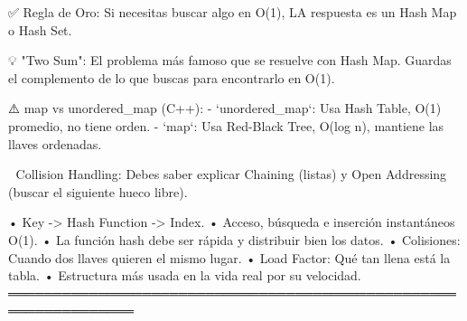 \begin{dsaentrevistas}

✅ Regla de Oro: Si necesitas buscar algo en O(1), LA respuesta es
   un Hash Map o Hash Set. 

💡 "Two Sum": El problema más famoso que se resuelve con Hash Map. 
   Guardas el complemento de lo que buscas para encontrarlo en O(1).

⚠️ map vs unordered\_map (C++):
   - `unordered\_map`: Usa Hash Table, O(1) promedio, no tiene orden.
   - `map`: Usa Red-Black Tree, O(log n), mantiene las llaves ordenadas.

🔑 Collision Handling: Debes saber explicar Chaining (listas) y 
   Open Addressing (buscar el siguiente hueco libre).

\end{dsaentrevistas}

\begin{dsaresumen}

• Key -> Hash Function -> Index.
• Acceso, búsqueda e inserción instantáneos O(1).
• La función hash debe ser rápida y distribuir bien los datos.
• Colisiones: Cuando dos llaves quieren el mismo lugar.
• Load Factor: Qué tan llena está la tabla.
• Estructura más usada en la vida real por su velocidad.
════════════════════════════════════════════════════════════════

\end{dsaresumen}


